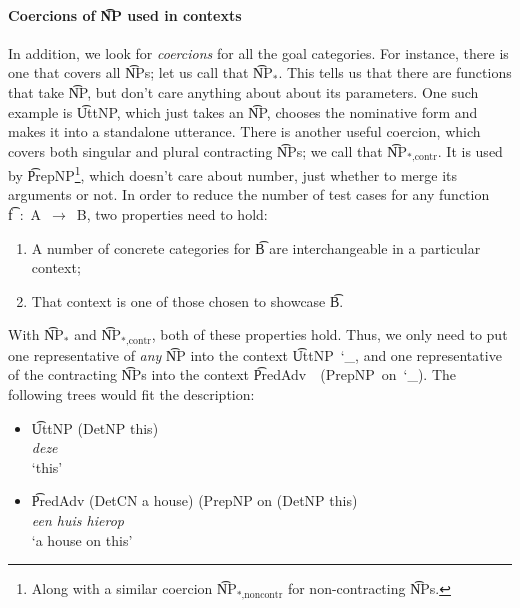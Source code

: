 \paragraph{Coercions of \t{NP} used in contexts} In addition, we look
for \emph{coercions} for all the goal categories. For instance, there
is one that covers all \t{NP}s; let us call that \t{NP$_*$}. This
tells us that there are functions that take \t{NP}, but don’t care
anything about about its parameters. One such example is \t{UttNP},
which just takes an \t{NP}, chooses the nominative form and makes it
into a standalone utterance.  There is another useful coercion, which
covers both singular and plural contracting \t{NP}s; we call that
\t{NP$_{*\text{,contr}}$}. It is used by \t{PrepNP}\footnote{Along
  with a similar coercion \t{NP$_{*\text{,noncontr}}$} for
  non-contracting \t{NP}s.}, which doesn't care about number, just
whether to merge its arguments or not.  In order to reduce the number
of test cases for any function \t{f~:~A~$\rightarrow$~B}, two
properties need to hold:
\begin{enumerate}
\item A number of concrete categories for \t{B} are interchangeable in a particular
context;
\item That context is one of those chosen to showcase \t{B}.
\end{enumerate}

\noindent With \t{NP$_*$} and \t{NP$_\text{*,contr}$}, both of these
properties hold.
Thus, we only need to put one representative of \emph{any} \t{NP} into
the context \t{UttNP~\char`_}, and one representative of the
contracting \t{NP}s into the context \t{PredAdv~~(PrepNP~on~\char`_)}. 
The following trees would fit the description:

\begin{itemize}
\item[] \t{UttNP (DetNP this)}  \\
 \emph{deze} \\
 `this'
\item[] \t{PredAdv (DetCN a house) (PrepNP on (DetNP this)}  \\
\emph{een huis hierop} \\
`a house on this'
\end{itemize}



